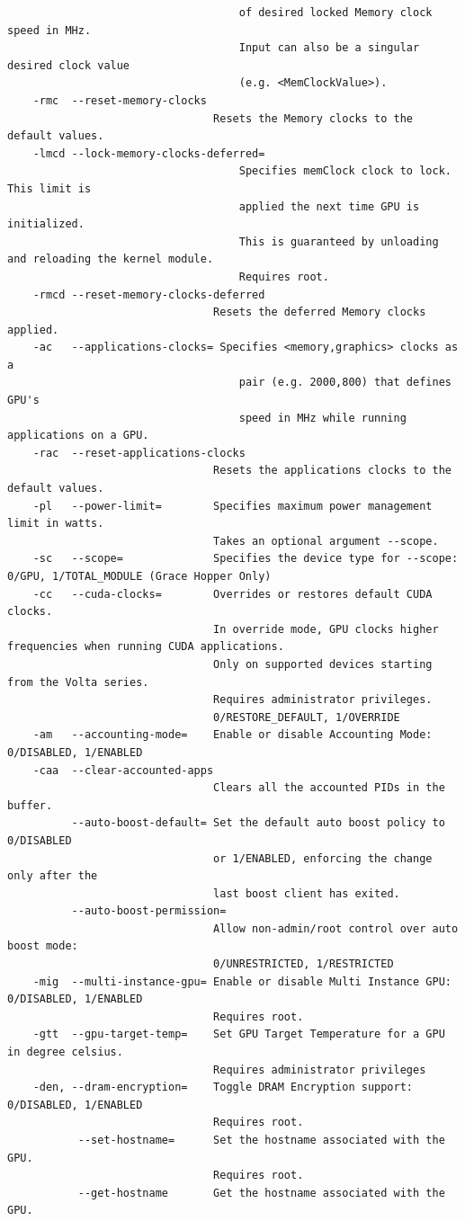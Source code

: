 \begin{lstlisting}
                                    of desired locked Memory clock speed in MHz.
                                    Input can also be a singular desired clock value
                                    (e.g. <MemClockValue>).
    -rmc  --reset-memory-clocks
                                Resets the Memory clocks to the default values.
    -lmcd --lock-memory-clocks-deferred=
                                    Specifies memClock clock to lock. This limit is
                                    applied the next time GPU is initialized.
                                    This is guaranteed by unloading and reloading the kernel module.
                                    Requires root.
    -rmcd --reset-memory-clocks-deferred
                                Resets the deferred Memory clocks applied.
    -ac   --applications-clocks= Specifies <memory,graphics> clocks as a
                                    pair (e.g. 2000,800) that defines GPU's
                                    speed in MHz while running applications on a GPU.
    -rac  --reset-applications-clocks
                                Resets the applications clocks to the default values.
    -pl   --power-limit=        Specifies maximum power management limit in watts.
                                Takes an optional argument --scope.
    -sc   --scope=              Specifies the device type for --scope: 0/GPU, 1/TOTAL_MODULE (Grace Hopper Only)
    -cc   --cuda-clocks=        Overrides or restores default CUDA clocks.
                                In override mode, GPU clocks higher frequencies when running CUDA applications.
                                Only on supported devices starting from the Volta series.
                                Requires administrator privileges.
                                0/RESTORE_DEFAULT, 1/OVERRIDE
    -am   --accounting-mode=    Enable or disable Accounting Mode: 0/DISABLED, 1/ENABLED
    -caa  --clear-accounted-apps
                                Clears all the accounted PIDs in the buffer.
          --auto-boost-default= Set the default auto boost policy to 0/DISABLED
                                or 1/ENABLED, enforcing the change only after the
                                last boost client has exited.
          --auto-boost-permission=
                                Allow non-admin/root control over auto boost mode:
                                0/UNRESTRICTED, 1/RESTRICTED
    -mig  --multi-instance-gpu= Enable or disable Multi Instance GPU: 0/DISABLED, 1/ENABLED
                                Requires root.
    -gtt  --gpu-target-temp=    Set GPU Target Temperature for a GPU in degree celsius.
                                Requires administrator privileges
    -den, --dram-encryption=    Toggle DRAM Encryption support: 0/DISABLED, 1/ENABLED
                                Requires root.
           --set-hostname=      Set the hostname associated with the GPU.
                                Requires root.
           --get-hostname       Get the hostname associated with the GPU.


\end{lstlisting}
